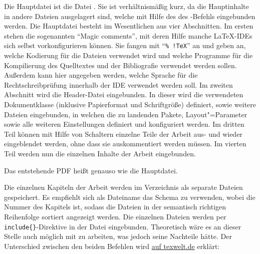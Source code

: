 Die Hauptdatei ist die Datei .
Sie ist verhältnismäßig kurz, da die Hauptinhalte in andere Dateien ausgelagert sind, welche mit Hilfe des  \bzw des -Befehls eingebunden werden.
Die Hauptdatei besteht im Wesentlichen aus vier Abschnitten.
Im ersten stehen die sogenannten \enquote{Magic comments}, mit deren Hilfe manche \LaTeX-IDEs sich selbst vorkonfigurieren können.
Sie fangen mit \enquote{\texttt{\%~!TeX}} an und geben an, welche Kodierung für die Dateien verwendet wird und welche Programme für die Kompilierung des Quelltextes und der Bibliografie verwendet werden sollen.
Außerdem kann hier angegeben werden, welche Sprache für die Rechtschreibprüfung innerhalb der IDE verwendet werden soll.
Im zweiten Abschnitt wird die Header-Datei eingebunden.
In dieser wird die verwendeten Dokumentklasse (inklusive Papierformat und Schriftgröße) definiert, sowie weitere Dateien eingebunden,
in welchen die zu landenden Pakete, Layout"=Parameter sowie alle weiteren Einstellungen definiert und konfiguriert werden.
Im dritten Teil können mit Hilfe von Schaltern einzelne Teile der Arbeit aus- und wieder eingeblendet werden, ohne dass sie auskommentiert werden müssen.
Im vierten Teil werden nun die einzelnen Inhalte der Arbeit eingebunden.

Das entstehende PDF heißt genauso wie die Hauptdatei.

Die einzelnen Kapiteln der Arbeit werden im Verzeichnis  als separate Dateien gespeichert.
Es empfiehlt sich als Dateiname das Schema  zu verwenden, wobei  die Nummer des Kapitels ist,
sodass die Dateien in der semantisch richtigen Reihenfolge sortiert angezeigt werden.
Die einzelnen Dateien werden per \verb+include{}+-Direktive in der Datei  eingebunden.
Theoretisch wäre es an dieser Stelle auch möglich mit \verb++ zu arbeiten, was jedoch seine Nachteile hätte.
Der Unterschied zwischen den beiden Befehlen wird \href{https://texwelt.de/wissen/fragen/32/was-ist-der-unterschied-zwischen-include-and-input}{auf texwelt.de} erklärt:

